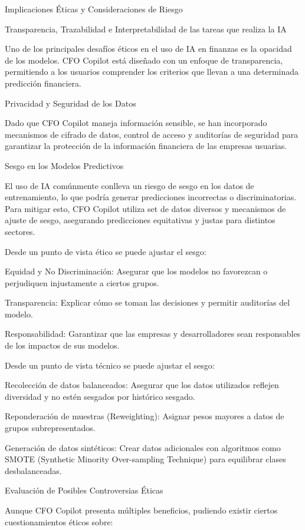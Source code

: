 \documentclass[12pt,letterpaper,oneside]{report}
\renewcommand{\_}{\UnderscoreOriginal\allowbreak}
\begin{document}
Implicaciones Éticas y Consideraciones de Riesgo

Transparencia, Trazabilidad e Interpretabilidad de las tareas que realiza la IA

Uno de los principales desafíos éticos en el uso de IA en finanzas es la opacidad de los modelos. CFO Copilot está diseñado con un enfoque de transparencia, permitiendo a los usuarios comprender los criterios que llevan a una determinada predicción financiera.

Privacidad y Seguridad de los Datos

Dado que CFO Copilot maneja información sensible, se han incorporado mecanismos de cifrado de datos, control de acceso y auditorías de seguridad para garantizar la protección de la información financiera de las empresas usuarias.

Sesgo en los Modelos Predictivos

El uso de IA comúnmente conlleva un riesgo de sesgo en los datos de entrenamiento, lo que podría generar predicciones incorrectas o discriminatorias. Para mitigar esto, CFO Copilot utiliza set de datos diversos y mecanismos de ajuste de sesgo, asegurando predicciones equitativas y justas para distintos sectores.

Desde un punto de vista ético se puede ajustar el sesgo:

Equidad y No Discriminación: Asegurar que los modelos no favorezcan o perjudiquen injustamente a ciertos grupos.

Transparencia: Explicar cómo se toman las decisiones y permitir auditorías del modelo.

Responsabilidad: Garantizar que las empresas y desarrolladores sean responsables de los impactos de sus modelos.

Desde un punto de vista técnico se puede ajustar el sesgo:

Recolección de datos balanceados: Asegurar que los datos utilizados reflejen diversidad y no estén sesgados por histórico sesgado.

Reponderación de muestras (Reweighting): Asignar pesos mayores a datos de grupos subrepresentados.

Generación de datos sintéticos: Crear datos adicionales con algoritmos como SMOTE (Synthetic Minority Over-sampling Technique) para equilibrar clases desbalanceadas.

Evaluación de Posibles Controversias Éticas

Aunque CFO Copilot presenta múltiples beneficios, pudiendo existir ciertos cuestionamientos éticos sobre:
\end{document}
